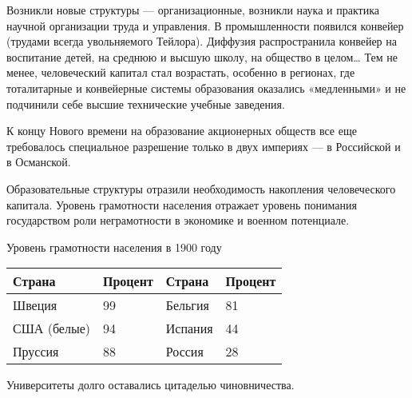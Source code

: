 Возникли новые структуры — организационные, возникли наука и практика научной организации труда и управления. В
промышленности появился конвейер (трудами всегда увольняемого Тейлора). Диффузия распространила конвейер на воспитание
детей, на среднюю и высшую школу, на общество в целом… Тем не менее, человеческий капитал стал возрастать, особенно в
регионах, где тоталитарные и конвейерные системы образования оказались «медленными» и не подчинили себе высшие
технические учебные заведения.


К концу Нового времени на образование акционерных обществ все еще требовалось специальное разрешение только в двух
империях — в Российской и в Османской.


Образовательные структуры отразили необходимость накопления человеческого капитала. Уровень грамотности населения
отражает уровень понимания государством роли неграмотности в экономике и военном потенциале.

{\centering{}
Уровень грамотности населения в 1900 году
\par}

\begin{center}
\tablefirsthead{}
\tablehead{}
\tabletail{}
\tablelasttail{}
\begin{supertabular}{|m{0.9698598in}|m{0.6705598in}|m{0.6330598in}|m{0.6775598in}|}
\hline
\bfseries Страна  &
\bfseries Процент  &
\bfseries Страна &
\bfseries Процент\\\hline
 Швеция  &
 99 &
 Бельгия &
 81\\\hline
 США (белые) &
 94 &
 Испания &
 44\\\hline
 Пруссия  &
 88 &
 Россия &
 28\\\hline
\end{supertabular}
\end{center}

\bigskip

Университеты долго оставались цитаделью чиновничества.

%
